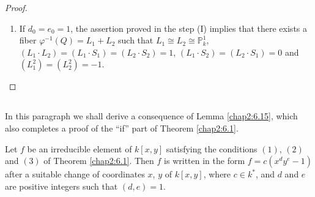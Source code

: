 \begin{proof}
\begin{enumerate}
\item If $d_{0}=e_{0}=1$, the assertion proved in the step (I) implies
  that there exists a fiber $\varphi^{-1}(Q)=L_{1}+L_{2}$ such that
  $L_{1}\cong L_{2}\cong \mathbb{P}^{1}_{k}$, $(L_{1}\cdot
  L_{2})=(L_{1}\cdot S_{1})=(L_{2}\cdot S_{2})=1$, $(L_{1}\cdot
  S_{2})=(L_{2}\cdot S_{1})=0$ and $(L^{2}_{1})=(L^{2}_{2})=-1$.
\end{enumerate}
\end{proof}

\subsection{}\label{chap2:6.16}
In this paragraph we shall derive a consequence of Lemma
\ref{chap2:6.15}, which also completes a proof of the ``if'' part of
Theorem \ref{chap2:6.1}.

\begin{lemma*}
Let $f$ be an irreducible element of $k[x,y]$ satisfying the
conditions $(1)$, $(2)$ and $(3)$ of Theorem \ref{chap2:6.1}. Then $f$ is
written in the form $f=c(x^{d}y^{e}-1)$ after a suitable change of
coordinates $x$, $y$ of $k[x,y]$, where $c\in k^{\ast}$, and $d$ and
$e$ are positive integers such that $(d,e)=1$.
\end{lemma*}

